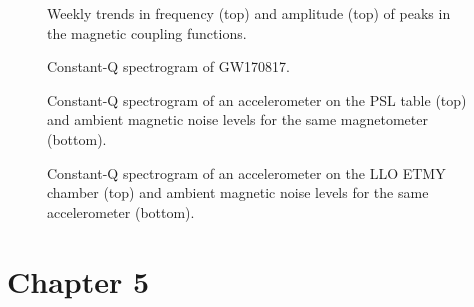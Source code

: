 \documentclass[11pt]{article}
\begin{document}
\begin{figure}
	\centering
	\caption{Weekly trends in frequency (top) and amplitude (top) of peaks in the magnetic coupling functions.}
	\label{fig:weekly-mag-variation}
\end{figure}

\begin{figure}
	\centering
	\caption{Constant-Q spectrogram of GW170817.}
	\label{fig:vetting-gw170817-spectrogram}
\end{figure}

\begin{figure}
	\centering
	\caption{Constant-Q spectrogram of an accelerometer on the PSL table (top) and ambient magnetic noise levels for the same magnetometer (bottom).}
	\label{fig:vetting-gw170817-lho}
\end{figure}

\begin{figure}
	\centering
	\caption{Constant-Q spectrogram of an accelerometer on the LLO ETMY chamber (top) and ambient magnetic noise levels for the same accelerometer (bottom).}
	\label{fig:vetting-gw170817-llo}
\end{figure}

\section{Chapter 5}
\end{document}
